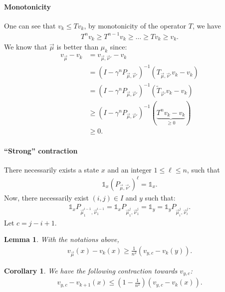 \documentclass{article}
\newtheorem{lemma}{Lemma}
\newtheorem{corollary}{Corollary}
\def\1{{\mathds 1}}
\begin{document}
\paragraph{Monotonicity}

One can see that $v_k \le T v_k$, by monotonicity of the operator $T$, we have
\begin{align}
  \label{croissance}
  T^n v_k \ge T^{n-1}v_k \ge \dots \ge T v_k  \ge v_k.
\end{align}
We know that $\vec\mu$ is better than $\mu_k$ since:
\begin{align}
  v_{\vec\mu} - v_k & =  v_{\vec\mu,\vec\nu'} - v_k \\
  & = (I-\gamma^n P_{\vec\mu,\vec\nu'})^{-1}(T_{\vec\mu,\vec\nu'} v_k - v_k) \\
  & = (I-\gamma^n P_{\vec\mu,\vec\nu'})^{-1}(\tilde T_{\vec\nu'} v_k - v_k) \\
  & \ge (I-\gamma^n P_{\vec\mu,\vec\nu'})^{-1}(\underbrace{T^n v_k - v_k}_{\ge 0}) \\
  & \ge 0.
\end{align}

\paragraph{``Strong'' contraction}

There necessarily exists a state $x$ and an integer $1 \le \ell \le n$, such that
\begin{align}
\1_x (P_{\vec\mu,\vec\nu'})^\ell = \1_x.
\end{align}
Now, there necessarily exist $(i,j) \in I$ and $y$ such that:
\begin{align}
  \1_x P_{\vec\mu_1^{i-1},\vec\nu_1^{i-1}} = \1_x P_{\vec\mu_1^j,\vec\nu_1^j} = \1_y = \1_y P_{\vec\mu_i^j,\vec\nu_i^j}.
\end{align}
Let $c=j-i+1$.

\begin{lemma}
  With the notations above,
\begin{align}
v_{\vec\mu}(x) - v_k(x) \ge \frac{1}{n^2} (v_{y,c} - v_k(y)).
\end{align}
\end{lemma}
\begin{corollary}
  We have the following contraction towards $v_{y,c}$:
  \begin{align}
    v_{y,c} - v_{k+1}(x) \le \left(1 - \frac{1}{n^2} \right)(v_{y,c}- v_k(x)).
  \end{align}
\end{corollary}
\end{document}
